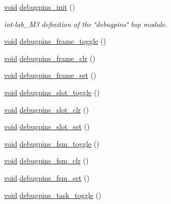 \begin{DoxyCompactItemize}
\item 
\hyperlink{usb__devapi_8h_afabf60e7f57651d6d595a02c75f07cd0}{void} \hyperlink{group__debugpins_ga67b42e8786576ba76a5dbfd6b61bbf90}{debugpins\+\_\+init} ()
\begin{DoxyCompactList}\small\item\em iot-\/lab\+\_\+\+M3 definition of the \char`\"{}debugpins\char`\"{} bsp module. \end{DoxyCompactList}\item 
\hyperlink{usb__devapi_8h_afabf60e7f57651d6d595a02c75f07cd0}{void} \hyperlink{group__debugpins_gaf5f2b7fbde11bd076c0c3e867653fa08}{debugpins\+\_\+frame\+\_\+toggle} ()
\item 
\hyperlink{usb__devapi_8h_afabf60e7f57651d6d595a02c75f07cd0}{void} \hyperlink{group__debugpins_gada37390552bee362863d82aa858f7aed}{debugpins\+\_\+frame\+\_\+clr} ()
\item 
\hyperlink{usb__devapi_8h_afabf60e7f57651d6d595a02c75f07cd0}{void} \hyperlink{group__debugpins_ga2a1a3edef66d4588cb179ee254935790}{debugpins\+\_\+frame\+\_\+set} ()
\item 
\hyperlink{usb__devapi_8h_afabf60e7f57651d6d595a02c75f07cd0}{void} \hyperlink{group__debugpins_gaa50950bd15a2a2ad12412ab5fbf0eb12}{debugpins\+\_\+slot\+\_\+toggle} ()
\item 
\hyperlink{usb__devapi_8h_afabf60e7f57651d6d595a02c75f07cd0}{void} \hyperlink{group__debugpins_ga46be7a970bd088dbf58868c806a90ff6}{debugpins\+\_\+slot\+\_\+clr} ()
\item 
\hyperlink{usb__devapi_8h_afabf60e7f57651d6d595a02c75f07cd0}{void} \hyperlink{group__debugpins_ga7707a462a0287f9c35fd70cd7ffbfa6a}{debugpins\+\_\+slot\+\_\+set} ()
\item 
\hyperlink{usb__devapi_8h_afabf60e7f57651d6d595a02c75f07cd0}{void} \hyperlink{group__debugpins_gaa140c9166f959c8bf59b2a5053e7318f}{debugpins\+\_\+fsm\+\_\+toggle} ()
\item 
\hyperlink{usb__devapi_8h_afabf60e7f57651d6d595a02c75f07cd0}{void} \hyperlink{group__debugpins_gaba8ca5762f3946abe08a2fd60f526018}{debugpins\+\_\+fsm\+\_\+clr} ()
\item 
\hyperlink{usb__devapi_8h_afabf60e7f57651d6d595a02c75f07cd0}{void} \hyperlink{group__debugpins_gabf50b5145dad1b666f26d5ddbc824e40}{debugpins\+\_\+fsm\+\_\+set} ()
\item 
\hyperlink{usb__devapi_8h_afabf60e7f57651d6d595a02c75f07cd0}{void} \hyperlink{group__debugpins_ga99a18520e34187483e8914b69ef05afd}{debugpins\+\_\+task\+\_\+toggle} ()

\end{DoxyCompactItemize}

